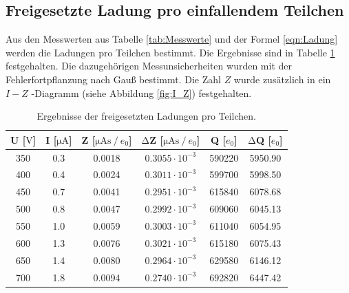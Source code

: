 \subsection{Freigesetzte Ladung pro einfallendem Teilchen}
\label{subsec:LadungProTeilchen}
Aus den Messwerten aus Tabelle \ref{tab:Messwerte} und der Formel \ref{eqn:Ladung} werden die Ladungen pro Teilchen bestimmt.
Die Ergebnisse sind in Tabelle \ref{tab:Ladungen} festgehalten.
Die dazugehörigen Messunsicherheiten wurden mit der Fehlerfortpflanzung nach Gauß bestimmt.
Die Zahl $Z$ wurde zusätzlich in ein $I-Z$ -Diagramm (siehe Abbildung \ref{fig:I_Z}) festgehalten.

\begin{table}
  \centering
  \caption{Ergebnisse der freigesetzten Ladungen pro Teilchen.}
  \label{tab:Ladungen}
  \begin{tabular}{c c c c c c}
    \toprule
    {U [$\si{\volt}$]} & {I [$\si{\micro\ampere}$]} & {Z [$\si{\micro\ampere\second} \mathbin{/} e_0 $]} & {$\increment$Z [$\si{\micro\ampere\second} \mathbin{/} e_0 $]} & {Q [$e_0$]} & {$\increment$Q [$e_0$]}\\
    \midrule
    350 &0.3 & 0.0018 & $0.3055 \cdot 10^{-3}$ & 590220& 5950.90 \\
    400 &0.4 & 0.0024 & $0.3011 \cdot 10^{-3}$ & 599700& 5998.50 \\
    450 &0.7 & 0.0041 & $0.2951 \cdot 10^{-3}$ & 615840& 6078.68 \\
    500 &0.8 & 0.0047 & $0.2992 \cdot 10^{-3}$ & 609060& 6045.13 \\
    550 &1.0 & 0.0059 & $0.3003 \cdot 10^{-3}$ & 611040& 6054.95 \\
    600 &1.3 & 0.0076 & $0.3021 \cdot 10^{-3}$ & 615180& 6075.43 \\
    650 &1.4 & 0.0080 & $0.2964 \cdot 10^{-3}$ & 629580& 6146.12 \\
    700 &1.8 & 0.0094 & $0.2740 \cdot 10^{-3}$ & 692820& 6447.42 \\
    \bottomrule
  \end{tabular}
\end{table}

